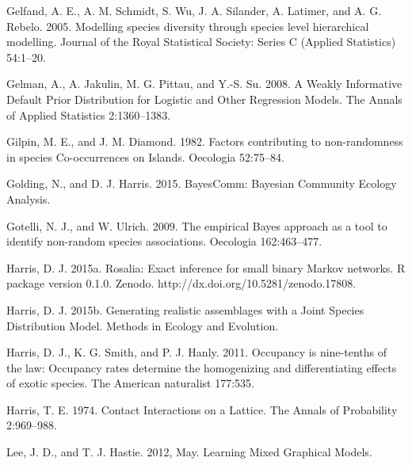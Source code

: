 \documentclass[12pt,]{article}
\begin{document}
\begin{spacing}{1.9}
\begin{flushleft}
Gelfand, A. E., A. M. Schmidt, S. Wu, J. A. Silander, A. Latimer, and A.
G. Rebelo. 2005. Modelling species diversity through species level
hierarchical modelling. Journal of the Royal Statistical Society: Series
C (Applied Statistics) 54:1--20.

Gelman, A., A. Jakulin, M. G. Pittau, and Y.-S. Su. 2008. A Weakly
Informative Default Prior Distribution for Logistic and Other Regression
Models. The Annals of Applied Statistics 2:1360--1383.

Gilpin, M. E., and J. M. Diamond. 1982. Factors contributing to
non-randomness in species Co-occurrences on Islands. Oecologia
52:75--84.

Golding, N., and D. J. Harris. 2015. BayesComm: Bayesian Community
Ecology Analysis.

Gotelli, N. J., and W. Ulrich. 2009. The empirical Bayes approach as a
tool to identify non-random species associations. Oecologia
162:463--477.

Harris, D. J. 2015a. Rosalia: Exact inference for small binary Markov
networks. R package version 0.1.0. Zenodo.
http://dx.doi.org/10.5281/zenodo.17808.

Harris, D. J. 2015b. Generating realistic assemblages with a Joint
Species Distribution Model. Methods in Ecology and Evolution.

Harris, D. J., K. G. Smith, and P. J. Hanly. 2011. Occupancy is
nine-tenths of the law: Occupancy rates determine the homogenizing and
differentiating effects of exotic species. The American naturalist
177:535.

Harris, T. E. 1974. Contact Interactions on a Lattice. The Annals of
Probability 2:969--988.

Lee, J. D., and T. J. Hastie. 2012, May. Learning Mixed Graphical
Models.


\end{flushleft}
\end{spacing}
\end{document}
